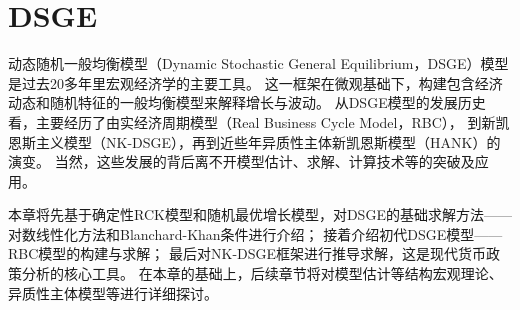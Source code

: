 

\chapter{DSGE}  \label{ch-dsge}

动态随机一般均衡模型（Dynamic Stochastic General Equilibrium，DSGE）模型是过去20多年里宏观经济学的主要工具。
这一框架在微观基础下，构建包含经济动态和随机特征的一般均衡模型来解释增长与波动。
从DSGE模型的发展历史看，主要经历了由实经济周期模型（Real Business Cycle Model，RBC），
到新凯恩斯主义模型（NK-DSGE），再到近些年异质性主体新凯恩斯模型（HANK）的演变。
当然，这些发展的背后离不开模型估计、求解、计算技术等的突破及应用。

本章将先基于确定性RCK模型和随机最优增长模型，对DSGE的基础求解方法——对数线性化方法和Blanchard-Khan条件进行介绍；
接着介绍初代DSGE模型——RBC模型的构建与求解；
最后对NK-DSGE框架进行推导求解，这是现代货币政策分析的核心工具。
在本章的基础上，后续章节将对模型估计等结构宏观理论、异质性主体模型等进行详细探讨。








